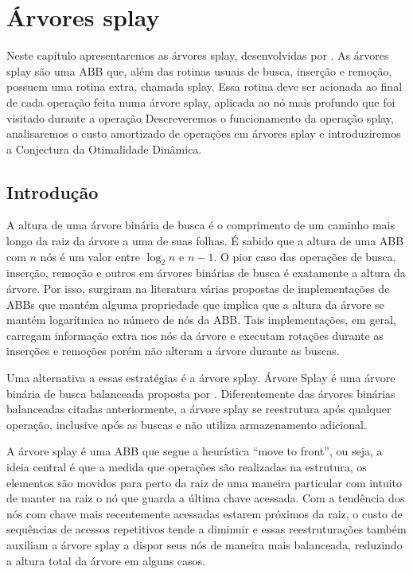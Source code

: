 
\chapter{Árvores splay}
\label{cap:arvores-splay}

\newtheorem{caso}{Caso}

Neste capítulo apresentaremos as árvores splay, desenvolvidas por \cite{selfadjustingbst}. As árvores splay são uma ABB que, além das rotinas usuais de busca, inserção e remoção, possuem uma rotina extra, chamada splay. Essa rotina deve ser acionada ao final de cada operação feita numa árvore splay, aplicada ao nó mais profundo que foi visitado durante a operação Descreveremos o funcionamento da operação splay, analisaremos o custo amortizado de operações em árvores splay e introduziremos a Conjectura da Otimalidade Dinâmica.


\section{Introdução}
A altura de uma árvore binária de busca é o comprimento de um caminho mais longo da raiz da árvore a uma de suas folhas. É sabido que a altura de uma ABB com $n$ nós é um valor entre $\log_2 n$ e $n-1$. O pior caso das operações de busca, inserção, remoção e outros em árvores binárias de busca é exatamente a altura da árvore. Por isso, surgiram na literatura várias propostas de implementações de ABBs que mantém alguma propriedade que implica que a altura da árvore se mantém logarítmica no número de nós da ABB. Tais implementações, em geral, carregam informação extra nos nós da árvore e executam rotações durante as inserções e remoções porém não alteram a árvore durante as buscas.

Uma alternativa a essas estratégias é a árvore splay. Árvore Splay é uma árvore binária de busca balanceada proposta por \cite{selfadjustingbst}. Diferentemente das árvores binárias balanceadas citadas anteriormente, a árvore splay se reestrutura após qualquer operação, inclusive após as buscas e não utiliza armazenamento adicional.

A árvore splay é uma ABB que segue a heurística “move to front”, ou seja, a ideia central é que a medida que operações são realizadas na estrutura, os elementos são movidos para perto da raiz de uma maneira particular com intuito de manter na raiz o nó que guarda a última chave acessada.
Com a tendência dos nós com chave mais recentemente acessadas estarem próximos da raiz, o custo de sequências de acessos repetitivos tende a diminuir e essas reestruturações também auxiliam a árvore splay a dispor seus nós de maneira mais balanceada, reduzindo a altura total da árvore em alguns casos.

